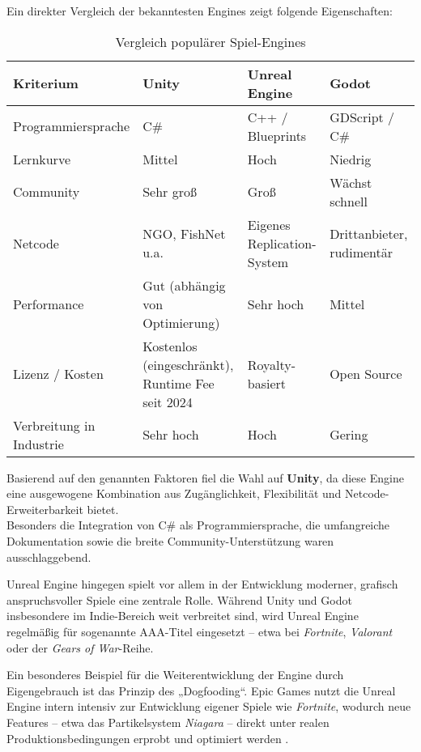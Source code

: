 \documentclass{article}
\begin{document}
Ein direkter Vergleich der bekanntesten Engines zeigt folgende Eigenschaften:

\begin{table}[H]
\centering
\caption{Vergleich populärer Spiel-Engines}
{\small
\begin{tabularx}{\textwidth}{|l|Y|Y|Y|}
\hline
\textbf{Kriterium} & \textbf{Unity} & \textbf{Unreal Engine} & \textbf{Godot} \\
\hline
Programmiersprache & C\# & C++ / Blueprints & GDScript / C\# \\
\hline
Lernkurve & Mittel & Hoch & Niedrig \\
\hline
Community & Sehr groß & Groß & Wächst schnell \\
\hline
Netcode & NGO, FishNet u.a. & Eigenes Replication-System & Drittanbieter, rudimentär \\
\hline
Performance & Gut (abhängig von Optimierung) & Sehr hoch & Mittel \\
\hline
Lizenz / Kosten & Kostenlos (eingeschränkt), Runtime Fee seit 2024 \cite{unitylicense} & Royalty-basiert \cite{unrealpricing} & Open Source \cite{godotdoc} \\
\hline
Verbreitung in Industrie & Sehr hoch & Hoch & Gering \\
\hline
\end{tabularx}
}
\end{table}

\newpage
Basierend auf den genannten Faktoren fiel die Wahl auf \textbf{Unity}, da diese Engine eine ausgewogene Kombination aus Zugänglichkeit, Flexibilität und Netcode-Erweiterbarkeit bietet. \\
Besonders die Integration von C\# als Programmiersprache, die umfangreiche Dokumentation sowie die breite Community-Unterstützung waren ausschlaggebend.

Unreal Engine hingegen spielt vor allem in der Entwicklung moderner, grafisch anspruchsvoller Spiele eine zentrale Rolle. Während Unity und Godot insbesondere im Indie-Bereich weit verbreitet sind, wird Unreal Engine regelmäßig für sogenannte AAA-Titel eingesetzt -- etwa bei \textit{Fortnite}, \textit{Valorant} oder der \textit{Gears of War}-Reihe.

Ein besonderes Beispiel für die Weiterentwicklung der Engine durch Eigengebrauch ist das Prinzip des „Dogfooding“. Epic Games nutzt die Unreal Engine intern intensiv zur Entwicklung eigener Spiele wie \textit{Fortnite}, wodurch neue Features -- etwa das Partikelsystem \textit{Niagara} -- direkt unter realen Produktionsbedingungen erprobt und optimiert werden \cite{dogfoodingexample}.
\end{document}
